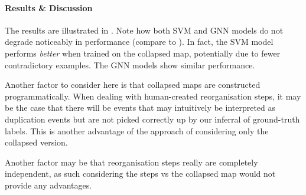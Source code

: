 \documentclass[
	fontsize=10pt, %
	twoside=false, %
	secnumdepth=1, %
  toc=indentunnumbered %
]{kaobook}
\begin{document}
\paragraph{Results \& Discussion} The results are illustrated in
. Note how both SVM and GNN models do
not degrade noticeably in performance (compare to ). In
fact, the SVM model performs \textit{better} when trained on the collapsed map,
potentially due to fewer contradictory examples. The GNN models show similar
performance.


Another factor to consider here is that collapsed maps are constructed
programmatically. When dealing with human-created reorganisation steps, it may
be the case that there will be events that may intuitively be interpreted as
duplication events but are not picked correctly up by our inferral of
ground-truth labels. This is another advantage of the approach of considering
only the collapsed version.

Another factor may be that reorganisation steps really are completely
independent, as such considering the steps vs the collapsed map would not
provide any advantages.







\end{document}
